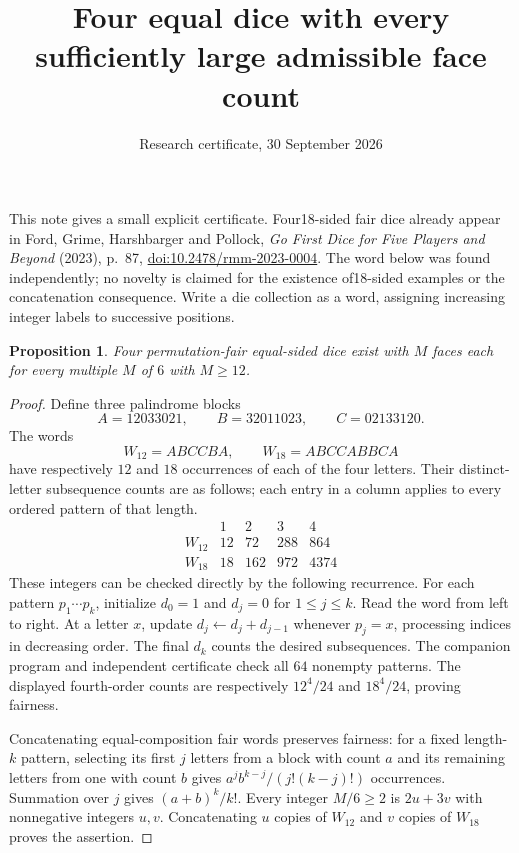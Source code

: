 \documentclass[11pt]{article}
\title{Four equal dice with every sufficiently large admissible face count}
\author{Research certificate, 30 September 2026}
\date{}
\newtheorem{proposition}{Proposition}
\begin{document}
\maketitle

This note gives a small explicit certificate. Four18-sided fair dice
already appear in Ford, Grime, Harshbarger and Pollock,
\emph{Go First Dice for Five Players and Beyond} (2023), p.~87,
\href{https://doi.org/10.2478/rmm-2023-0004}{doi:10.2478/rmm-2023-0004}.
The word below was found independently; no novelty is claimed for the
existence of18-sided examples or the concatenation consequence. Write a die collection as a word, assigning increasing
integer labels to successive positions.

\begin{proposition}
Four permutation-fair equal-sided dice exist with $M$ faces each for every
multiple $M$ of $6$ with $M\ge12$.
\end{proposition}
\begin{proof}
Define three palindrome blocks
\[
 A=12033021,\qquad B=32011023,\qquad C=02133120.
\]
The words
\[
 W_{12}=ABCCBA,\qquad W_{18}=ABCCABBCA
\]
have respectively $12$ and $18$ occurrences of each of the four letters.
Their distinct-letter subsequence counts are as follows; each entry in
a column applies to every ordered pattern of that length.
\[
\begin{array}{c|rrrr}
 &1&2&3&4\\\hline
 W_{12}&12&72&288&864\\
 W_{18}&18&162&972&4374
\end{array}
\]
These integers can be checked directly by the following recurrence.
For each pattern $p_1\cdots p_k$, initialize $d_0=1$ and $d_j=0$ for
$1\le j\le k$. Read the word from left to right. At a letter $x$, update
$d_j\gets d_j+d_{j-1}$ whenever $p_j=x$, processing indices in decreasing
order. The final $d_k$ counts the desired subsequences. The companion
program and independent certificate check all $64$ nonempty patterns.
The displayed fourth-order counts are respectively $12^4/24$ and
$18^4/24$, proving fairness.

Concatenating equal-composition fair words preserves fairness: for a
fixed length-$k$ pattern, selecting its first $j$ letters from a block
with count $a$ and its remaining letters from one with count $b$ gives
$a^j b^{k-j}/(j!(k-j)!)$ occurrences. Summation over $j$ gives
$(a+b)^k/k!$.
Every integer $M/6\ge2$ is $2u+3v$ with nonnegative integers $u,v$.
Concatenating $u$ copies of $W_{12}$ and $v$ copies of $W_{18}$ proves
the assertion.
\end{proof}
\end{document}
